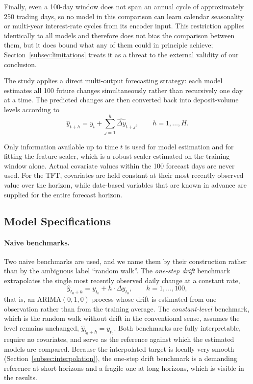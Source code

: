 \documentclass[11pt,a4paper]{article}
\begin{document}
Finally, even a 100-day window does not span an annual cycle of approximately
250 trading days, so no model in this comparison can learn calendar
seasonality or multi-year interest-rate cycles from its encoder input. This
restriction applies identically to all models and therefore does not bias the
comparison between them, but it does bound what any of them could in principle
achieve; Section~\ref{subsec:limitations} treats it as a threat to the
external validity of our conclusion.

The study applies a direct multi-output forecasting strategy: each model
estimates all 100 future changes simultaneously rather than recursively one
day at a time. The predicted changes are then converted back into
deposit-volume levels according to
\begin{equation}
    \widehat{y}_{t+h}
    =
    y_t+
    \sum_{j=1}^{h}
    \widehat{\Delta y}_{t+j},
    \qquad h=1,\ldots,H.
    \label{eq:level_reconstruction}
\end{equation}

\indent Only information available up to time $t$ is used for model estimation
and for fitting the feature scaler, which is a robust scaler estimated on the
training window alone. Actual covariate values within the 100 forecast days
are never used. For the TFT, covariates are held constant at their most
recently observed value over the horizon, while date-based variables that are
known in advance are supplied for the entire forecast horizon.

\subsection{Model Specifications}

\paragraph{Naive benchmarks.}
Two naive benchmarks are used, and we name them by their construction rather
than by the ambiguous label ``random walk''. The \emph{one-step drift}
benchmark extrapolates the single most recently observed daily change at a
constant rate,
\begin{equation*}
    \hat{y}_{t_0+h} = y_{t_0} + h \cdot \Delta y_{t_0}, \qquad h = 1, \dots, 100 ,
\end{equation*}
that is, an ARIMA$(0,1,0)$ process whose drift is estimated from one
observation rather than from the training average. The
\emph{constant-level} benchmark, which is the random walk without drift in the
conventional sense, assumes the level remains unchanged,
$\hat{y}_{t_0+h} = y_{t_0}$. Both benchmarks are fully interpretable, require
no covariates, and serve as the reference against which the estimated models
are compared. Because the interpolated target is locally very smooth
(Section~\ref{subsec:interpolation}), the one-step drift benchmark is a
demanding reference at short horizons and a fragile one at long horizons,
which is visible in the results.
\end{document}
